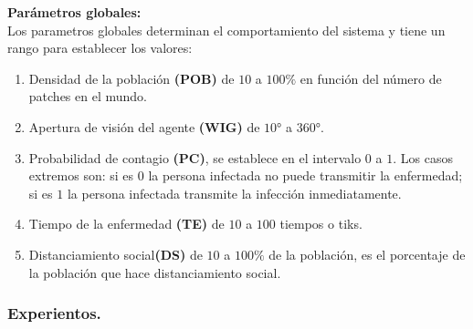 \documentclass[12pt]{article}
\begin{document}
\textbf{Parámetros globales:}\\

Los parametros globales determinan el comportamiento del sistema y tiene un rango para establecer los valores:\\

\begin{enumerate}
    \item Densidad de la población \textbf{(POB)} de $10$ a $100\%$ en función del número de patches en el mundo.
    \item Apertura de visión del agente \textbf{(WIG)} de $10$° a $360$°.
    \item Probabilidad de contagio \textbf{(PC)}, se establece en el intervalo $0$ a $1$. Los casos extremos son: si es $0$ la persona infectada no puede transmitir la enfermedad; si es $1$ la persona infectada
    transmite la infección inmediatamente.
    \item Tiempo de la enfermedad \textbf{(TE)} de $10$ a $100$ tiempos o tiks.
    \item Distanciamiento social\textbf{(DS)} de $10$ a $100\%$ de la población, es el porcentaje de la población que hace distanciamiento social.
\end{enumerate}

{\color{blue} \subsubsection*{Experientos.}}
\vspace{1em}
\end{document}
